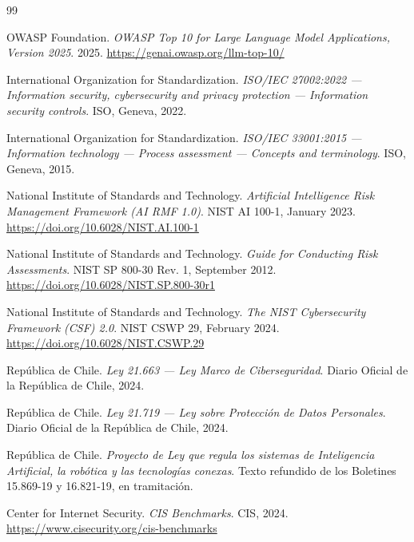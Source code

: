 \label{ch:referencias}

\begin{thebibliography}{99}

    OWASP Foundation.
    \textit{OWASP Top 10 for Large Language Model Applications, Version 2025}.
    2025.
    \url{https://genai.owasp.org/llm-top-10/}

    International Organization for Standardization.
    \textit{ISO/IEC 27002:2022 --- Information security, cybersecurity and privacy protection --- Information security controls}.
    ISO, Geneva, 2022.

    International Organization for Standardization.
    \textit{ISO/IEC 33001:2015 --- Information technology --- Process assessment --- Concepts and terminology}.
    ISO, Geneva, 2015.

    National Institute of Standards and Technology.
    \textit{Artificial Intelligence Risk Management Framework (AI RMF 1.0)}.
    NIST AI 100-1, January 2023.
    \url{https://doi.org/10.6028/NIST.AI.100-1}

    National Institute of Standards and Technology.
    \textit{Guide for Conducting Risk Assessments}.
    NIST SP 800-30 Rev. 1, September 2012.
    \url{https://doi.org/10.6028/NIST.SP.800-30r1}

    National Institute of Standards and Technology.
    \textit{The NIST Cybersecurity Framework (CSF) 2.0}.
    NIST CSWP 29, February 2024.
    \url{https://doi.org/10.6028/NIST.CSWP.29}

    República de Chile.
    \textit{Ley 21.663 --- Ley Marco de Ciberseguridad}.
    Diario Oficial de la República de Chile, 2024.

    República de Chile.
    \textit{Ley 21.719 --- Ley sobre Protección de Datos Personales}.
    Diario Oficial de la República de Chile, 2024.

    República de Chile.
    \textit{Proyecto de Ley que regula los sistemas de Inteligencia Artificial, la robótica y las tecnologías conexas}.
    Texto refundido de los Boletines 15.869-19 y 16.821-19, en tramitación.

    Center for Internet Security.
    \textit{CIS Benchmarks}.
    CIS, 2024.
    \url{https://www.cisecurity.org/cis-benchmarks}


\end{thebibliography}
